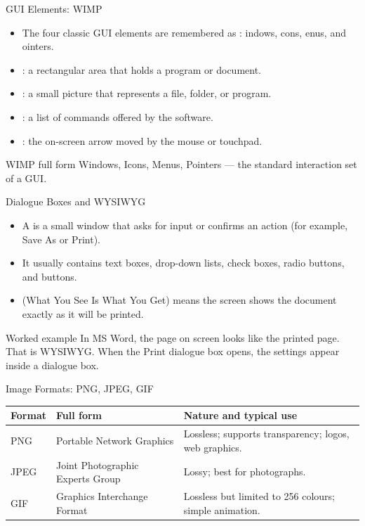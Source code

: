 \documentclass[aspectratio=169]{beamer}
\begin{document}
\begin{frame}{GUI Elements: WIMP}
  \begin{itemize}
    \item The four classic GUI elements are remembered as :
      indows, cons, enus, and ointers.
    \item {}: a rectangular area that holds a program or document.
    \item {}: a small picture that represents a file, folder, or
      program.
    \item {}: a list of commands offered by the software.
    \item {}: the on-screen arrow moved by the mouse or touchpad.
  \end{itemize}
  \begin{block}{WIMP full form}
    Windows, Icons, Menus, Pointers --- the standard interaction set of a GUI.
  \end{block}
\end{frame}

\begin{frame}{Dialogue Boxes and WYSIWYG}
  \begin{itemize}
    \item A  is a small window that asks for input or
      confirms an action (for example, Save As or Print).
    \item It usually contains text boxes, drop-down lists, check boxes, radio
      buttons, and  buttons.
    \item {} (What You See Is What You Get) means the screen shows
      the document exactly as it will be printed.
  \end{itemize}
  \begin{exampleblock}{Worked example}
    In MS Word, the page on screen looks like the printed page. That is
    WYSIWYG. When the Print dialogue box opens, the settings appear inside a
    dialogue box.
  \end{exampleblock}
\end{frame}

\begin{frame}{Image Formats: PNG, JPEG, GIF}
  \begin{center}
    \begin{tabular}{p{}p{}p{}}
      \toprule
      \textbf{Format} & \textbf{Full form} & \textbf{Nature and typical use} \\
      \midrule
      PNG & Portable Network Graphics & Lossless; supports transparency; logos, web graphics. \\
      JPEG & Joint Photographic Experts Group & Lossy; best for photographs. \\
      GIF & Graphics Interchange Format & Lossless but limited to 256 colours; simple animation. \\
      \bottomrule
    \end{tabular}
  \end{center}
  \vspace{0.2cm}
\end{frame}
\end{document}
